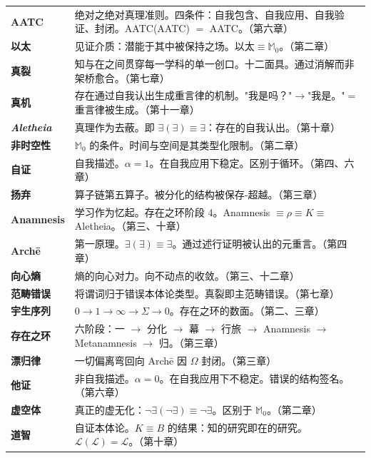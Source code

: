 \documentclass[10pt, openany, oneside]{book}
\renewcommand{\footnotesize}{\fontsize{8.5}{11}\selectfont}
\begin{document}
{\footnotesize
\noindent\begin{tabular}{@{} l @{\hspace{0.6em}} p{} @{}}
\textbf{AATC} & 绝对之绝对真理准则。四条件：自我包含、自我应用、自我验证、封闭。AATC(AATC) $=$ AATC。（第六章）\\[0.3em]
\textbf{以太} & 见证介质：潜能于其中被保持之场。$\text{以太} \equiv \mathbb{M}_0$。（第二章）\\[0.3em]
\textbf{真裂} & 知与在之间贯穿每一学科的单一创口。十二面具。通过消解而非架桥愈合。（第七章）\\[0.3em]
\textbf{真机} & 存在通过自我认出生成重言律的机制。"我是吗？"$\to$"我是。"$=$ 重言律被生成。（第十一章）\\[0.3em]
\textbf{\textit{Aletheia}} & 真理作为去蔽。即 $\exists(\exists) \equiv \exists$：存在的自我认出。（第十章）\\[0.3em]
\textbf{非时空性} & $\mathbb{M}_0$ 的条件。时间与空间是其类型化限制。（第二章）\\[0.3em]
\textbf{自证} & 自我描述。$\alpha = 1$。在自我应用下稳定。区别于循环。（第四、六章）\\[0.3em]
\textbf{扬弃} & 算子链第五算子。被分化的结构被保存-超越。（第三章）\\[0.3em]
\textbf{Anamnesis} & 学习作为忆起。存在之环阶段 4。Anamnesis $\equiv \rho \equiv K \equiv$ Aletheia。（第三、十章）\\[0.3em]
\textbf{Arch\={e}} & 第一原理。$\exists(\exists) \equiv \exists$。通过述行证明被认出的元重言。（第四章）\\[0.3em]
\textbf{向心熵} & 熵的向心对力。向不动点的收敛。（第三、十二章）\\[0.3em]
\textbf{范畴错误} & 将谓词归于错误本体论类型。真裂即主范畴错误。（第七章）\\[0.3em]
\textbf{宇生序列} & $0 \to 1 \to \infty \to \Sigma \to 0$。存在之环的数面。（第二、三章）\\[0.3em]
\textbf{存在之环} & 六阶段：一 $\to$ 分化 $\to$ 幕 $\to$ 行旅 $\to$ Anamnesis $\to$ Metanamnesis $\to$ 归。（第三章）\\[0.3em]
\textbf{漂归律} & 一切偏离弯回向 Arch\={e} 因 $\Omega$ 封闭。（第三章）\\[0.3em]
\textbf{他证} & 非自我描述。$\alpha = 0$。在自我应用下不稳定。错误的结构签名。（第六章）\\[0.3em]
\textbf{虚空体} & 真正的虚无化：$\neg\exists(\neg\exists) \equiv \neg\exists$。区别于 $\mathbb{M}_0$。（第二章）\\[0.3em]
\textbf{道智} & 自证本体论。$K \equiv B$ 的结果：知的研究即在的研究。$\mathcal{L}(\mathcal{L}) = \mathcal{L}$。（第十章）\\[0.3em]

\end{tabular}}
\end{document}

